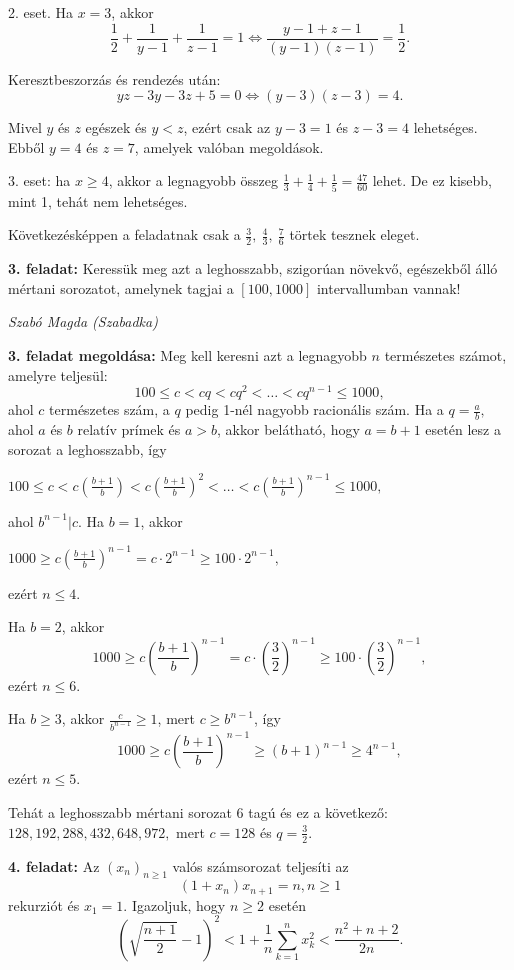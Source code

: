 \documentclass[a4paper,10pt]{article}
\def\ki#1#2{\hfill {\it #1 (#2)}\medskip}
\begin{document}
2. eset. Ha $x=3$, akkor
$$\frac{1}{2}+\frac{1}{y-1}+\frac{1}{z-1}=1\Longleftrightarrow
\frac{y-1+z-1}{(y-1)(z-1)}=\frac{1}{2}.$$

Keresztbeszorzás és rendezés után:
$$yz-3y-3z+5=0\Longleftrightarrow
(y-3)(z-3)=4.$$

Mivel $y$ és $z$ egészek és $y<z$, ezért csak  az $y-3=1$ és $z-3=4$
lehetséges. Ebből $y=4$ és $z=7$, amelyek valóban megoldások.

3. eset: ha $x\ge4$, akkor a legnagyobb összeg
$\frac{1}{3}+\frac{1}{4}+\frac{1}{5}=\frac{47}{60}$ lehet. De ez
kisebb, mint 1, tehát nem lehetséges.

Következésképpen a feladatnak csak a $\frac{3}{2},\ \frac{4}{3},\
\frac{7}{6}$ törtek tesznek eleget.

\medskip


{\bf 3. feladat: } Keressük meg azt a leghosszabb, szigorúan növekvő, egészekből álló
mértani sorozatot, amelynek tagjai a $[100,1000]$ intervallumban
vannak!

\ki{Szabó Magda}{Szabadka}\medskip

\textbf{3. feladat megoldása: } Meg kell keresni azt a legnagyobb $n$ természetes számot, amelyre teljesül:
$$100\leq c<cq<cq^2<\dots<cq^{n-1}\leq1000,$$ ahol $c$ természetes szám, a $q$ pedig 1-nél nagyobb racionális szám.
Ha a $q=\frac{a}{b},$ ahol $a$ és $b$ relatív prímek és $a>b$, akkor
belátható, hogy $a=b+1$ esetén lesz a sorozat a leghosszabb, így

\centerline{$100\leq
c<c\left(\frac{b+1}{b}\right)<c\left(\frac{b+1}{b}\right)^2<\ldots<c\left(\frac{b+1}{b}\right)^{n-1}\leq1000,$}

\noindent ahol $ b^{n-1}|c.$ Ha $b=1$, akkor

\centerline{$1000\geq
c\left(\frac{b+1}{b}\right)^{n-1}=c\cdot2^{n-1}\geq100\cdot2^{n-1},$}
ezért $n\leq4.$

Ha $b=2$, akkor $$1000\geq
c\left(\frac{b+1}{b}\right)^{n-1}=c\cdot\left(\frac{3}{2}\right)^{n-1}\geq100\cdot\left(\frac{3}{2}\right)^{n-1},$$
ezért $n\leq6$.

Ha $b\geq3$, akkor $\frac{c}{b^{n-1}}\geq1$, mert $c\geq b^{n-1}$,
így $$1000\geq c\left(\frac{b+1}{b}\right)^{n-1}\geq(b+1)^{n-1}\geq
4^{n-1},$$ ezért $n\leq5$.

Tehát a leghosszabb mértani sorozat $6$ tagú és ez a következő:
$128, 192, 288, 432, 648, 972,$ mert $c=128$ és $q=\frac{3}{2}$.

\medskip

{\bf 4. feladat: } Az $(x_n)_{n\geq 1}$ valós számsorozat teljesíti az
$$(1+x_n)x_{n+1}=n, n\geq 1$$ rekurziót és $x_1=1.$ Igazoljuk,
hogy $n\geq 2$ esetén
$$\left (\sqrt{\frac{n+1}{2}}-1 \right)^2<1+\frac 1n\sum\limits_{k=1}^n x_k^2<\frac{n^2+n+2}{2n}.$$
\end{document}
